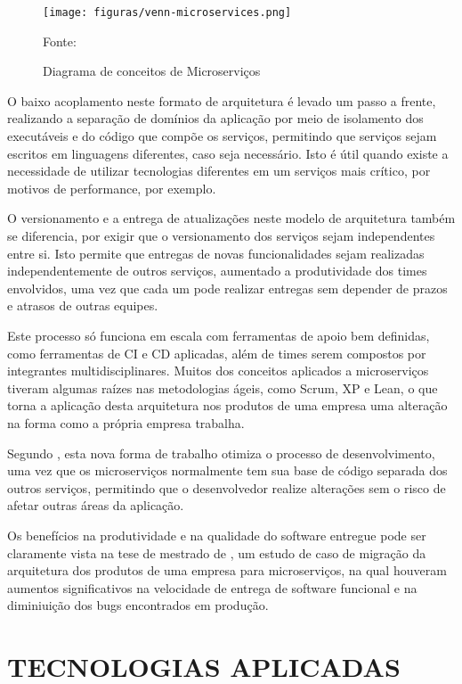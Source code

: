 \begin{figure}[H]
	\centering
	\caption{Diagrama de conceitos de Microserviços}
	\texttt{[image: figuras/venn-microservices.png]}

	\label{fig:venn-microservices}
	\footnotesize Fonte: 
\end{figure}

O baixo acoplamento neste formato de arquitetura é levado um passo a frente,
realizando a separação de domínios da aplicação por meio de isolamento dos
executáveis e do código que compõe os serviços, permitindo que serviços
sejam escritos em linguagens diferentes, caso seja necessário. Isto é útil
quando existe a necessidade de utilizar tecnologias diferentes em um
serviços mais crítico, por motivos de performance, por exemplo.

O versionamento e a entrega de atualizações neste modelo de arquitetura
também se diferencia, por exigir que o versionamento dos serviços sejam
independentes entre si. Isto permite que entregas de novas funcionalidades
sejam realizadas independentemente de outros serviços, aumentado a
produtividade dos times envolvidos, uma vez que cada um pode realizar entregas
sem depender de prazos e atrasos de outras equipes.

Este processo só funciona em escala com ferramentas de apoio bem definidas,
como ferramentas de \ac{CI} e \ac{CD} aplicadas, além de times serem compostos
por integrantes multidisciplinares. Muitos dos conceitos aplicados a
microserviços tiveram algumas raízes nas metodologias ágeis, como Scrum, XP e
Lean, o que torna a aplicação desta arquitetura nos produtos de uma empresa
uma alteração na forma como a própria empresa trabalha.

Segundo , esta nova forma de trabalho otimiza o processo
de desenvolvimento, uma vez que os microserviços normalmente tem sua base de
código separada dos outros serviços, permitindo que o desenvolvedor realize
alterações sem o risco de afetar outras áreas da aplicação.

Os benefícios na produtividade e na qualidade do software entregue pode
ser claramente vista na tese de mestrado de , um estudo
de caso de migração da arquitetura dos produtos de uma empresa para
microserviços, na qual houveram aumentos significativos na velocidade de
entrega de software funcional e na diminiuição dos bugs encontrados em
produção.

\section{TECNOLOGIAS APLICADAS}

